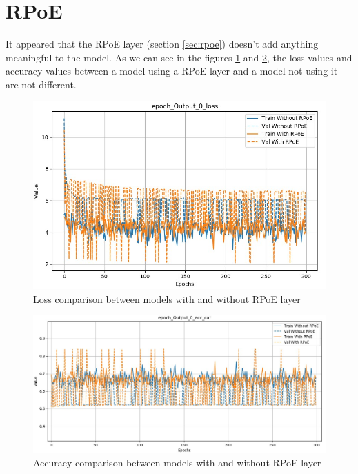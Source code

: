 \documentclass[12pt]{report}
\begin{document}
\section{RPoE}

It appeared that the RPoE layer (section \ref{sec:rpoe}) doesn't add anything meaningful to the model.
As we can see in the figures \ref{fig:loss-comparison-rpoe} and \ref{fig:acc-comparison-rpoe}, the loss values and accuracy values between a model using a RPoE layer and a model not using it are not different.

\begin{figure}[ht]
    \centering
    \includegraphics[width=\textwidth]{images/experiences/rpoe/loss-comparison-rpoe.jpg}
    \caption{Loss comparison between models with and without RPoE layer}
    \label{fig:loss-comparison-rpoe}
\end{figure}

\begin{figure}[ht]
    \centering
    \includegraphics[width=\textwidth]{images/experiences/rpoe/acc-comparison-rpoe.jpg}
    \caption{Accuracy comparison between models with and without RPoE layer}
    \label{fig:acc-comparison-rpoe}
\end{figure}
\end{document}
